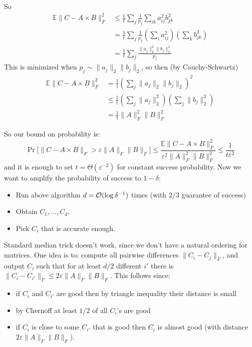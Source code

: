 \documentclass[11pt]{article}
\newcommand{\E}{{\mathbb E}}
\begin{document}
So
\begin{align*}
\E \| C - A \times B\|_F^2 &\le \frac{1}{t} \sum_j \frac{1}{p_j} \sum_{ik} a^2_{ij}b^2_{jk}\\
&=\frac{1}{t} \sum_j \frac{1}{p_j} \left(\sum_{i} a^2_{ij}\right)\left(\sum_k b^2_{jk}\right) \\
&=\frac{1}{t} \sum_j \frac{ \|a_j\|^2_2 \|b_j\|^2_2}{p_j} 
\end{align*}
This is minimized when $p_j \sim \|a_j\|_2 \|b_j\|_2$,  so then (by Cauchy-Schwartz)
\begin{align*}
\E \| C - A \times B\|_F^2 &= \frac{1}{t} \left(\sum_j \|a_j\|_2 \|b_j\|_2\right)^2\\
&\le \frac{1}{t} \left(\sum_j \|a_j\|_2^2\right)\left(\sum_j \|b_j\|_2^2\right)\\
&= \frac{1}{t} \|A\|_F^2 \|B\|_F^2
\end{align*}

So our bound on probability is:
$$\Pr\Big[\| C - A \times B\|_F > \varepsilon \|A\|_F \|B\|_F\Big] \le \frac{\E \| C - A \times B\|_F^2}{ \varepsilon^2 \|A\|_F^2 \|B\|_F^2 }  \le \frac{1}{t \varepsilon^2}$$
and it is enough to set $t = \Theta(\varepsilon^{-2})$ for constant success probability.
Now we want to amplify the probability of success to $1-\delta$:
\begin{itemize}
\item Run above algorithm $d = \mathcal{O}( \log \delta^{-1})$ times (with $2/3$ guarantee of success)
\item Obtain $C_1, \ldots, C_d$.
\item Pick $C_i$ that is accurate enough.
\end{itemize}

Standard median trick doesn't work, since we don't have a natural ordering for matrices.
One idea is to: compute all pairwise differences $\|C_i - C_j\|_F$, and output $C_i$ such that for at least $d/2$ different $i'$ there is $\|C_{i} - C_{i'}\|_F \le 2 \varepsilon \|A\|_F \|B\|_F$. This follows since:
\begin{itemize}
\item if $C_i$ and $C_{i'}$ are good then by triangle inequality their distance is small
\item by Chernoff at least $1/2$ of all $C_i$'s are good
\item if $C_i$ is close to some $C_{i'}$ that is good then $C_i$ is almost good (with distance $2\varepsilon \|A\|_F \|B\|_F$).
\end{itemize}
\end{document}
